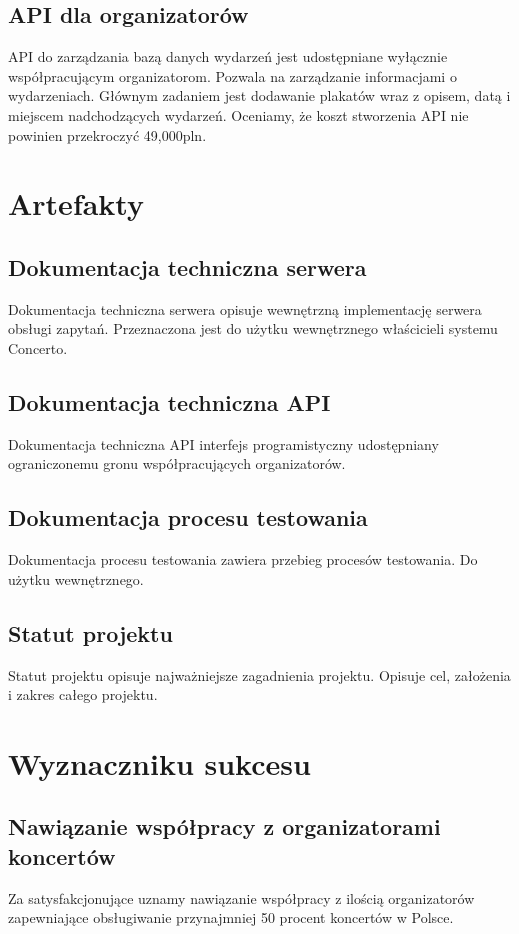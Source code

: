 \documentclass[10pt]{dokument-ppi}
\begin{document}
\subsection{API dla organizatorów}
API do zarządzania bazą danych wydarzeń jest udostępniane wyłącznie współpracującym organizatorom. Pozwala na zarządzanie informacjami o wydarzeniach. Głównym zadaniem jest dodawanie plakatów wraz z opisem, datą i miejscem nadchodzących wydarzeń. Oceniamy, że koszt stworzenia API nie powinien przekroczyć 49,000pln.

\section{Artefakty}

\subsection{Dokumentacja techniczna serwera}
Dokumentacja techniczna serwera opisuje wewnętrzną implementację serwera obsługi zapytań. Przeznaczona jest do użytku wewnętrznego właścicieli systemu Concerto.

\subsection{Dokumentacja techniczna API}
Dokumentacja techniczna API interfejs programistyczny udostępniany ograniczonemu gronu współpracujących organizatorów.

\subsection{Dokumentacja procesu testowania}
Dokumentacja procesu testowania zawiera przebieg procesów testowania. Do użytku wewnętrznego.

\subsection{Statut projektu}
Statut projektu opisuje najważniejsze zagadnienia projektu. Opisuje cel, założenia i zakres całego projektu.

\section{Wyznaczniku sukcesu}

\subsection{Nawiązanie współpracy z organizatorami koncertów}
Za satysfakcjonujące uznamy nawiązanie współpracy z ilością organizatorów zapewniające obsługiwanie przynajmniej 50 procent koncertów w Polsce.
\end{document}
